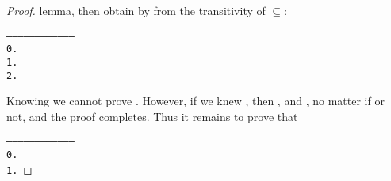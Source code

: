 \begin{proof}
lemma, then obtain  by
from the transitivity of $\subseteq$:
\begin{alltt}
   ------------------------------------
    0.  
    1.  
    2.  
\end{alltt}
Knowing  we cannot prove . However, if we knew , then , and 
, no matter if  or not, and the proof
completes. Thus it remains to prove that
\begin{alltt}
   ------------------------------------
    0.  
    1.  

\end{alltt}
\end{proof}

